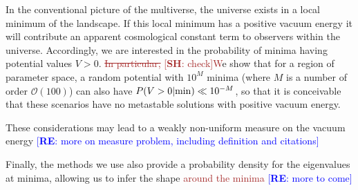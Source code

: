 \documentclass[12pt]{article}
\newcommand{\re}[1]{\textcolor{blue}{[{\bf RE}: #1]}}
\newcommand{\SH}[1]{\textcolor{brown}{[{\bf SH}: #1]}}
\newcommand{\sh}[1]{\textcolor{brown}{#1}}
\begin{document}


In the conventional picture of the multiverse, the universe exists in a local minimum of the landscape. If this local minimum has a positive vacuum energy it will contribute an apparent cosmological constant term to observers within the universe. Accordingly, we are interested in the probability of minima having potential values $V > 0$. \sh{\sout{In particular,} \SH{check}W}e show that for a region of parameter space, a random potential with $10^M$ minima (where $M$ is a number of order $\mathcal{O}(100)$) can also have $P(V > 0|{\rm min}) \ll 10^{-M}$, so that it is conceivable that these scenarios have no metastable solutions with  positive vacuum energy.

These considerations may lead to a weakly non-uniform measure on the vacuum energy  \re{more on measure problem, including definition and citations} 

Finally, the methods we use also provide a probability density for the eigenvalues at minima, allowing us to infer the shape \sh{around the minima} \re{more to come} 
\end{document}
